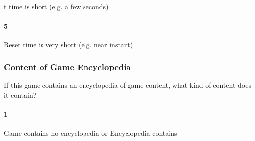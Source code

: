 t time is short (e.g. a few seconds)\paragraph{5}Reset time is very short (e.g. near instant)\subsubsection{Content of Game Encyclopedia}If this game contains an encyclopedia of game content, what kind of content does it contain?\paragraph{1}Game contains no encyclopedia or Encyclopedia contains